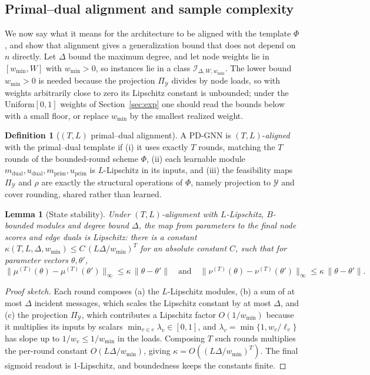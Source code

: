 \documentclass[11pt]{article}
\theoremstyle{plain}
\newtheorem{lemma}{Lemma}
\theoremstyle{definition}
\newtheorem{definition}{Definition}
\theoremstyle{remark}
\newcommand{\Ycal}{\mathcal{Y}}
\newcommand{\Ical}{\mathcal{I}}
\newcommand{\PDGNN}{\textsc{PD-GNN}}
\begin{document}
\subsection{Primal--dual alignment and sample complexity}
We now say what it means for the architecture to be aligned with the template
$\Phi$, and show that alignment gives a generalization bound that does not depend
on $n$ directly. Let $\Delta$ bound the maximum degree, and let node weights lie
in $[w_{\min},W]$ with $w_{\min}>0$, so instances lie in a class
$\Ical_{\Delta,W,w_{\min}}$. The lower bound $w_{\min}>0$ is needed because the
projection $\Pi_\Ycal$ divides by node loads, so with weights arbitrarily close to
zero its Lipschitz constant is unbounded; under the Uniform$[0,1]$ weights of
Section~\ref{sec:exp} one should read the bounds below with a small floor, or
replace $w_{\min}$ by the smallest realized weight.

\begin{definition}[$(T,L)$ primal--dual alignment]\label{def:align}
A \PDGNN{} is $(T,L)$-\emph{aligned} with the primal--dual template if (i) it
uses exactly $T$ rounds, matching the $T$ rounds of the bounded-round scheme
$\Phi$, (ii) each learnable module $m_{\mathrm{dual}},u_{\mathrm{dual}},
m_{\mathrm{prim}},u_{\mathrm{prim}}$ is $L$-Lipschitz in its inputs, and (iii)
the feasibility maps $\Pi_\Ycal$ and $\rho$ are exactly the structural operations
of $\Phi$, namely projection to $\Ycal$ and cover rounding, shared rather than
learned.
\end{definition}

\begin{lemma}[State stability]\label{lem:stab}
Under $(T,L)$-alignment with $L$-Lipschitz, $B$-bounded modules and degree bound
$\Delta$, the map from parameters to the final node scores and edge duals is
Lipschitz: there is a constant
$\kappa(T,L,\Delta,w_{\min})\le C\,(L\Delta/w_{\min})^T$ for an absolute constant
$C$, such that for parameter vectors $\theta,\theta'$,
\[
\bigl\|\mu^{(T)}(\theta)-\mu^{(T)}(\theta')\bigr\|_\infty\le\kappa\,\|\theta-\theta'\|
\quad\text{and}\quad
\bigl\|\nu^{(T)}(\theta)-\nu^{(T)}(\theta')\bigr\|_\infty\le\kappa\,\|\theta-\theta'\|.
\]
\end{lemma}
\begin{proof}[Proof sketch]
Each round composes (a) the $L$-Lipschitz modules, (b) a sum of at most $\Delta$
incident messages, which scales the Lipschitz constant by at most $\Delta$, and
(c) the projection $\Pi_\Ycal$, which contributes a Lipschitz factor
$O(1/w_{\min})$ because it multiplies its inputs by scalars
$\min_{v\in e}\lambda_v\in[0,1]$, and $\lambda_v=\min\{1,w_v/\ell_v\}$ has slope up
to $1/w_v\le 1/w_{\min}$ in the loads. Composing $T$ such rounds multiplies the
per-round constant $O(L\Delta/w_{\min})$, giving $\kappa=O((L\Delta/w_{\min})^T)$.
The final sigmoid readout is $1$-Lipschitz, and boundedness keeps the constants
finite.
\end{proof}
\end{document}
